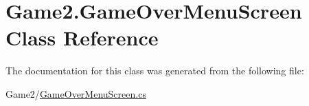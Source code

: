\hypertarget{class_game2_1_1_game_over_menu_screen}{}\section{Game2.\+Game\+Over\+Menu\+Screen Class Reference}
\label{class_game2_1_1_game_over_menu_screen}


The documentation for this class was generated from the following file\+:\begin{DoxyCompactItemize}
\item 
Game2/\mbox{\hyperlink{_game_over_menu_screen_8cs}{Game\+Over\+Menu\+Screen.\+cs}}\end{DoxyCompactItemize}
